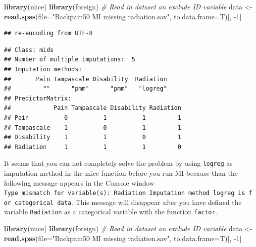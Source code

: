 \documentclass[
]{book}
\newenvironment{Shaded}{\begin{snugshade}}{\end{snugshade}}
\newcommand{\CommentTok}[1]{\textcolor[rgb]{0.56,0.35,0.01}{\textit{#1}}}
\newcommand{\DataTypeTok}[1]{\textcolor[rgb]{0.13,0.29,0.53}{#1}}
\newcommand{\DecValTok}[1]{\textcolor[rgb]{0.00,0.00,0.81}{#1}}
\newcommand{\KeywordTok}[1]{\textcolor[rgb]{0.13,0.29,0.53}{\textbf{#1}}}
\newcommand{\NormalTok}[1]{#1}
\newcommand{\OperatorTok}[1]{\textcolor[rgb]{0.81,0.36,0.00}{\textbf{#1}}}
\newcommand{\OtherTok}[1]{\textcolor[rgb]{0.56,0.35,0.01}{#1}}
\newcommand{\StringTok}[1]{\textcolor[rgb]{0.31,0.60,0.02}{#1}}
\begin{document}
\begin{Shaded}
\begin{Highlighting}[]
\KeywordTok{library}\NormalTok{(mice)}
\KeywordTok{library}\NormalTok{(foreign)}
\CommentTok{# Read in dataset an exclude ID variable}
\NormalTok{data <-}\StringTok{ }\KeywordTok{read.spss}\NormalTok{(}\DataTypeTok{file=}\StringTok{"Backpain50 MI missing radiation.sav"}\NormalTok{, }\DataTypeTok{to.data.frame=}\NormalTok{T)[, }\DecValTok{-1}\NormalTok{] }
\end{Highlighting}
\end{Shaded}

\begin{verbatim}
## re-encoding from UTF-8
\end{verbatim}

\begin{Shaded}
\end{Shaded}

\begin{verbatim}
## Class: mids
## Number of multiple imputations:  5 
## Imputation methods:
##       Pain Tampascale Disability  Radiation 
##         ""      "pmm"      "pmm"   "logreg" 
## PredictorMatrix:
##            Pain Tampascale Disability Radiation
## Pain          0          1          1         1
## Tampascale    1          0          1         1
## Disability    1          1          0         1
## Radiation     1          1          1         0
\end{verbatim}

It seems that you can not completely solve the problem by using \texttt{logreg} as imputation method in the mice function before you run MI because than the following message appears in the Console window \texttt{Type\ mismatch\ for\ variable(s):\ Radiation\ Imputation\ method\ logreg\ is\ for\ categorical\ data}. This message will disappear after you have defined the variable \texttt{Radiation} as a categorical variable with the function \texttt{factor}.

\begin{Shaded}
\begin{Highlighting}[]
\KeywordTok{library}\NormalTok{(mice)}
\KeywordTok{library}\NormalTok{(foreign)}
\CommentTok{# Read in dataset an exclude ID variable}
\NormalTok{data <-}\StringTok{ }\KeywordTok{read.spss}\NormalTok{(}\DataTypeTok{file=}\StringTok{"Backpain50 MI missing radiation.sav"}\NormalTok{, }\DataTypeTok{to.data.frame=}\NormalTok{T)[, }\DecValTok{-1}\NormalTok{] }
\end{Highlighting}
\end{Shaded}
\end{document}
